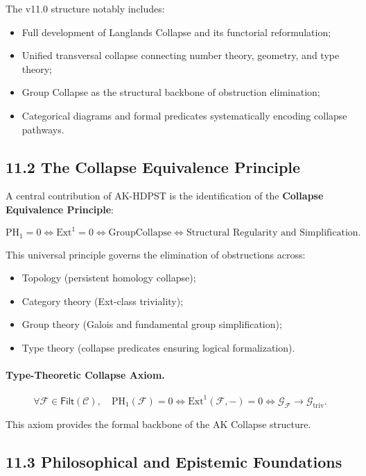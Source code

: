 \documentclass[11pt]{article}
\begin{document}
The v11.0 structure notably includes:

\begin{itemize}
    \item Full development of Langlands Collapse and its functorial reformulation;
    \item Unified transversal collapse connecting number theory, geometry, and type theory;
    \item Group Collapse as the structural backbone of obstruction elimination;
    \item Categorical diagrams and formal predicates systematically encoding collapse pathways.
\end{itemize}

\subsection*{11.2 The Collapse Equivalence Principle}

A central contribution of AK-HDPST is the identification of the \textbf{Collapse Equivalence Principle}:

\[
\mathrm{PH}_1 = 0 \iff \mathrm{Ext}^1 = 0 \iff \mathrm{GroupCollapse} \iff \text{Structural Regularity and Simplification}.
\]

This universal principle governs the elimination of obstructions across:

\begin{itemize}
    \item Topology (persistent homology collapse);
    \item Category theory (Ext-class triviality);
    \item Group theory (Galois and fundamental group simplification);
    \item Type theory (collapse predicates ensuring logical formalization).
\end{itemize}

\paragraph{Type-Theoretic Collapse Axiom.}
\[
\forall \mathcal{F} \in \mathsf{Filt}(\mathcal{C}), \quad \mathrm{PH}_1(\mathcal{F}) = 0 \iff \mathrm{Ext}^1(\mathcal{F}, -) = 0 \iff \mathcal{G}_{\mathcal{F}} \longrightarrow \mathcal{G}_{\mathrm{triv}}.
\]

This axiom provides the formal backbone of the AK Collapse structure.

\subsection*{11.3 Philosophical and Epistemic Foundations}
\end{document}
